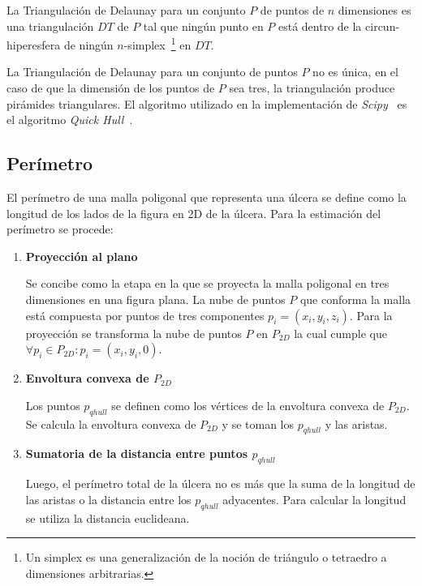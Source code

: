 \begin{definition}
	La Triangulación de Delaunay para un conjunto $P$ de puntos de $n$ dimensiones es una triangulación $DT$ de $P$ tal que ningún punto en $P$ está dentro de la circun-hiperesfera de ningún $n$-simplex~\footnote{Un simplex es una generalización de la noción de triángulo o tetraedro a dimensiones arbitrarias.} en $DT$.
\end{definition}

La Triangulación de Delaunay para un conjunto de puntos $P$ no es única, en el caso de que la dimensión de los puntos de $P$ sea tres, la triangulación produce pirámides triangulares. El algoritmo utilizado en la implementación de \textit{Scipy}~\cite{virtanen2020scipy} es el algoritmo \textit{Quick Hull}~\cite{barber1996quickhull}.

\subsection{Perímetro}

El perímetro de una malla poligonal que representa una úlcera se define como la longitud de los lados de la figura en 2D de la úlcera. Para la estimación del perímetro se procede:

\begin{enumerate}
	\item \textbf{Proyección al plano}
	
	Se concibe como la etapa en la que se proyecta la malla poligonal en tres dimensiones en una figura plana. La nube de puntos $P$ que conforma la malla está compuesta por puntos de tres componentes $p_i = (x_i, y_i, z_i)$. Para la proyección se transforma la nube de puntos $P$ en $P_{2D}$ la cual cumple que $\forall p_i \in P_{2D}: p_i = (x_i, y_i, 0)$.
	
	\item \textbf{Envoltura convexa de $P_{2D}$}
	
	Los puntos $p_{qhull}$ se definen como los vértices de la envoltura convexa de $P_{2D}$. Se calcula la envoltura convexa de $P_{2D}$ y se toman los $p_{qhull}$ y las aristas.
	
	\item \textbf{Sumatoria de la distancia entre puntos $p_{qhull}$}
	
	Luego, el perímetro total de la úlcera no es más que la suma de la longitud de las aristas o la distancia entre los $p_{qhull}$ adyacentes. Para calcular la longitud se utiliza la distancia euclideana.
	
\end{enumerate}

